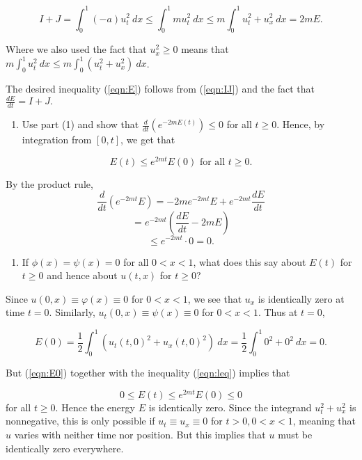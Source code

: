 \documentclass[
]{article}
\providecommand{\tightlist}{%
  \setlength{\itemsep}{0pt}\setlength{\parskip}{0pt}}
\begin{document}
\begin{equation} \label{eqn:IJ}
I+J= \int_{0}^{1}{ (-a)u_t^2 }\:dx \leq \int_{0}^{1}{ mu_t^2 }\:dx \leq m \int_{0}^{1}{ u_t^2 + u_x^2 }\:dx =2mE.
\end{equation}

Where we also used the fact that \(u_x^2 \geq 0\) means that
\(m\int_{0}^{1}{ u_t^2 }\:dx \leq m\int_{0}^{1}{ (u_t^2 + u_x^2) }\:dx\).

The desired inequality (\ref{eqn:E}) follows from (\ref{eqn:IJ}) and the
fact that \(\frac{dE}{dt}=I+J.\)

\begin{enumerate}
\def\labelenumi{(\arabic{enumi})}
\setcounter{enumi}{1}
\tightlist
\item
  Use part (1) and show that
  \(\frac{d}{dt} \left( e^{-2mE(t)} \right) \leq 0\) for all
  \(t \geq 0\). Hence, by integration from \([0,t]\), we get that
\end{enumerate}

\begin{equation}\label{eqn:leq}
E(t) \leq e^{2mt} E(0) \text{ for all } t \geq 0.
\end{equation}

By the product rule,
\[ \frac{d}{dt} \left(e^{-2mt}E\right)=-2me^{-2mt}E+e^{-2mt}\frac{dE}{dt} \]
\[=e^{-2mt}\left(\frac{dE}{dt}-2mE\right) \]
\[\leq e^{-2mt} \cdot 0=0. \]

\begin{enumerate}
\def\labelenumi{(\arabic{enumi})}
\setcounter{enumi}{2}
\tightlist
\item
  If \(\phi(x)=\psi(x)=0\) for all \(0<x<1\), what does this say about
  \(E(t)\) for \(t \geq 0\) and hence about \(u(t,x)\) for \(t \geq 0\)?
\end{enumerate}

Since \(u(0,x) \equiv \varphi(x) \equiv 0\) for \(0<x<1\), we see that
\(u_x\) is identically zero at time \(t=0\). Similarly,
\(u_t(0,x) \equiv \psi(x) \equiv 0\) for \(0<x<1\). Thus at \(t=0\),

\begin{equation}\label{eqn:E0}
E(0)= \frac{1}{2} \int_{0}^{1}{ \left(u_t(t,0)^2+u_x(t,0)^2\right)}\:dx =\frac{1}{2} \int_{0}^{1}{0^2+0^2 \:dx=0.}
\end{equation}

But (\ref{eqn:E0}) together with the inequality (\ref{eqn:leq}) implies
that

\[0 \leq E(t)  \leq e^{2mt}E(0) \leq 0\] for all \(t \geq 0\). Hence the
energy \(E\) is identically zero. Since the integrand \(u_t^2+u_x^2\) is
nonnegative, this is only possible if \(u_t \equiv u_x \equiv 0\) for
\(t>0, 0<x<1\), meaning that \(u\) varies with neither time nor
position. But this implies that \(u\) must be identically zero
everywhere.
\end{document}
